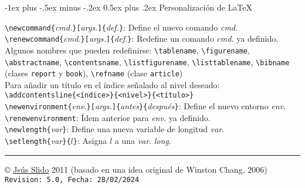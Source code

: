 \documentclass[10pt,landscape,a4paper]{article}
\makeatletter
\renewcommand{\section}{\@startsection{section}{1}{0mm}%
                                {-1ex plus -.5ex minus -.2ex}%
                                {0.5ex plus .2ex}%
                                {\normalfont\large\bfseries}}
\makeatother
\begin{document}
\begin{multicols}{3}
\section{Personalización de \LaTeX}

\verb!\newcommand{!\emph{cmd.}\verb!}[!\emph{args.}\verb!]{!\emph{def.}\verb!}!: Define el nuevo comando \emph{cmd}.\\
\verb!\renewcommand{!\emph{cmd.}\verb!}[!\emph{args.}\verb!]{!\emph{def.}\verb!}!: Redefine un comando \emph{cmd.} ya definido.\\[0.7mm]

 Algunos nombres que pueden redefinirse: \verb!\tablename!, \verb!\figurename!, \verb!\abstractname!, \verb!\contentsname!, \verb!\listfigurename!, \verb!\listtablename!, \verb!\bibname! (clases \texttt{report} y \texttt{book}), \verb!\refname! (clase \texttt{article})\\
 Para añadir un título en el índice señalado al nivel deseado:\\
\verb|\addcontentsline{<índice>}{<nivel>}{<título>}|\\[0.7mm]
 
\verb!\newenvironment{!\emph{env.}\verb!}[!\emph{args.}\verb!]{!\emph{antes}\verb!}{!\emph{después}\verb!}!: Define el nuevo entorno \emph{env}.\\
\verb!\renewenvironment!: Ídem anterior para \emph{env.} ya definido.\\
\verb!\newlength{!\emph{var}\verb!}!: Define una nueva variable de longitud \emph{var}.\\
\verb!\setlength{!\emph{var}\verb!}{!$l$\verb!}!: Asigna $l$ a una \emph{var}. \emph{long}.\\[0.7mm]
 

\rule{0.3\linewidth}{0.25pt}
\scriptsize

\copyright{}  \href{https://www.esi.uclm.es/www/jsalido}{Jsús Slido} 2011 (basado en una idea original de Winston Chang, 2006)\\
\verb!Revision: 5.0, Fecha: 28/02/2024!

\end{multicols}
\end{document}
